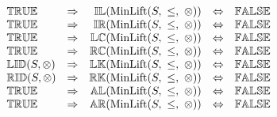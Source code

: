 \[\begin{array}{lcrcl}
{\mathbb{TRUE}}
	& \Rightarrow
	& {\mathbb{IL}}(\mathrm{MinLift}(S,\ \leq,\ \otimes)) 
	& \Leftrightarrow 
	& {\mathbb{FALSE}} 
	\\ 
{\mathbb{TRUE}}
	& \Rightarrow
	& {\mathbb{IR}}(\mathrm{MinLift}(S,\ \leq,\ \otimes)) 
	& \Leftrightarrow 
	& {\mathbb{FALSE}} 
	\\ 
{\mathbb{TRUE}}
	& \Rightarrow
	& {\mathbb{LC}}(\mathrm{MinLift}(S,\ \leq,\ \otimes)) 
	& \Leftrightarrow 
	& {\mathbb{FALSE}} 
	\\ 
{\mathbb{TRUE}}
	& \Rightarrow
	& {\mathbb{RC}}(\mathrm{MinLift}(S,\ \leq,\ \otimes)) 
	& \Leftrightarrow 
	& {\mathbb{FALSE}} 
	\\ 
{\mathbb{LID}}(S, \otimes)
	& \Rightarrow
	& {\mathbb{LK}}(\mathrm{MinLift}(S,\ \leq,\ \otimes)) 
	& \Leftrightarrow 
	& {\mathbb{FALSE}} 
	\\ 
{\mathbb{RID}}(S, \otimes)
	& \Rightarrow
	& {\mathbb{RK}}(\mathrm{MinLift}(S,\ \leq,\ \otimes)) 
	& \Leftrightarrow 
	& {\mathbb{FALSE}} 
	\\ 
{\mathbb{TRUE}}
	& \Rightarrow
	& {\mathbb{AL}}(\mathrm{MinLift}(S,\ \leq,\ \otimes))  
	& \Leftrightarrow 
	& {\mathbb{FALSE}} 
	\\ 
{\mathbb{TRUE}}
	& \Rightarrow
	& {\mathbb{AR}}(\mathrm{MinLift}(S,\ \leq,\ \otimes))  
	& \Leftrightarrow 
	& {\mathbb{FALSE}} 
	\\ 
\end{array} 
\] 
